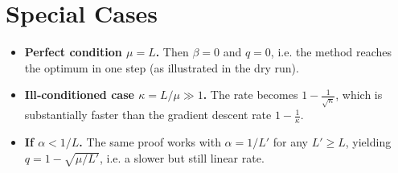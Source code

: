 \documentclass{article}
\begin{document}
\section*{Special Cases}
\begin{itemize}[leftmargin=*]
\item \textbf{Perfect condition $\mu=L$.} Then $\beta=0$ and $q=0$, i.e. the method reaches the optimum in one step (as illustrated in the dry run).
\item \textbf{Ill‑conditioned case $\kappa=L/\mu\gg1$.} The rate becomes $1-\frac{1}{\sqrt{\kappa}}$, which is substantially faster than the gradient descent rate $1-\frac{1}{\kappa}$.
\item \textbf{If $\alpha<1/L$.} The same proof works with $\alpha=1/L'$ for any $L'\ge L$, yielding $q=1-\sqrt{\mu/L'}$, i.e. a slower but still linear rate.
\end{itemize}
\end{document}
